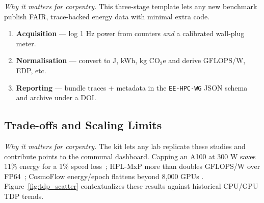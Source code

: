 \textit{Why it matters for carpentry.}  
This three-stage template lets any new benchmark publish FAIR, trace-backed energy data with minimal extra code.

\begin{enumerate}[leftmargin=*]
  \item \textbf{Acquisition} — log 1 Hz power from counters \emph{and} a calibrated wall-plug meter.
  \item \textbf{Normalisation} — convert to J, kWh, kg CO\(_2\)e and derive GFLOPS/W, EDP, etc.
  \item \textbf{Reporting} — bundle traces + metadata in the \texttt{EE-HPC-WG} JSON schema and archive under a DOI.
\end{enumerate}

\subsection{Trade-offs and Scaling Limits}
\label{sec:energy:tradeoffs}

\textit{Why it matters for carpentry.}  
The kit lets any lab replicate these studies and contribute points to the communal dashboard. Capping an A100 at 300 W saves 11\%  energy for a 1\% speed loss~\cite{nvidiadcgmenerg}; HPL-MxP more than doubles GFLOPS/W over FP64~\cite{hplmxphplai}; CosmoFlow energy/epoch flattens beyond 8,000 GPUs
\cite{cosmoflow2019}. Figure~\ref{fig:tdp_scatter} contextualizes these results against historical CPU/GPU TDP trends.

